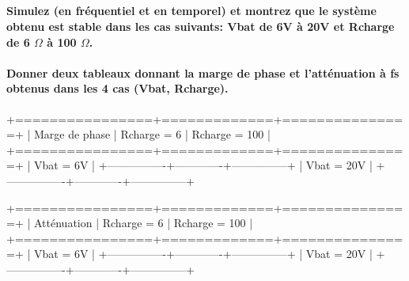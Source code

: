 \documentclass{article}
\begin{document}
~

~


~

\paragraph{Simulez (en fréquentiel et en temporel) et montrez que le système obtenu est stable dans les cas suivants: Vbat de 6V à 20V et Rcharge de 6 $\Omega$ à 100 $\Omega$.}

\paragraph{Donner deux tableaux donnant la marge de phase et l’atténuation à fs obtenus dans les 4 cas (Vbat, Rcharge).}

+================+=============+===============+
| Marge de phase | Rcharge = 6 | Rcharge = 100 |
+================+=============+===============+
| Vbat = 6V      |
+----------------+-------------+---------------+
| Vbat = 20V     |
+----------------+-------------+---------------+

+================+=============+===============+
| Atténuation    | Rcharge = 6 | Rcharge = 100 |
+================+=============+===============+
| Vbat = 6V      |
+----------------+-------------+---------------+
| Vbat = 20V     |
+----------------+-------------+---------------+
\end{document}
